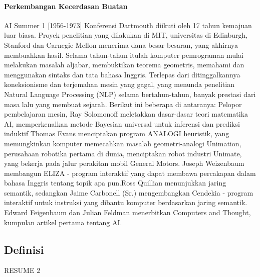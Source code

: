 \paragraph{Perkembangan Kecerdasan Buatan}\hspace{0pt} \par
AI Summer 1 [1956-1973]
Konferensi Dartmouth diikuti oleh 17 tahun kemajuan luar biasa. Proyek penelitian yang dilakukan di MIT, universitas di Edinburgh, Stanford dan Carnegie Mellon menerima dana besar-besaran, yang akhirnya membuahkan hasil.
Selama tahun-tahun itulah komputer pemrograman mulai melakukan masalah aljabar, membuktikan teorema geometris, memahami dan menggunakan sintaks dan tata bahasa Inggris. Terlepas dari ditinggalkannya koneksionisme dan terjemahan mesin yang gagal, yang menunda penelitian Natural Language Processing (NLP) selama bertahun-tahun, banyak prestasi dari masa lalu yang membuat sejarah. Berikut ini beberapa di antaranya:
Pelopor pembelajaran mesin, Ray Solomonoff meletakkan dasar-dasar teori matematika AI, memperkenalkan metode Bayesian universal untuk inferensi dan prediksi induktif Thomas Evans menciptakan program ANALOGI heuristik, yang memungkinkan komputer memecahkan masalah geometri-analogi Unimation, perusahaan robotika pertama di dunia, menciptakan robot industri Unimate, yang bekerja pada jalur perakitan mobil General Motors. Joseph Weizenbaum membangun ELIZA - program interaktif yang dapat membawa percakapan dalam bahasa Inggris tentang topik apa pun.Ross Quillian menunjukkan jaring semantik, sedangkan Jaime Carbonell (Sr.) mengembangkan Cendekia - program interaktif untuk instruksi yang dibantu komputer berdasarkan jaring semantik. Edward Feigenbaum dan Julian Feldman menerbitkan Computers and Thought, kumpulan artikel pertama tentang AI.
\subsection{Definisi}
RESUME 2

